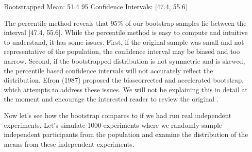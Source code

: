 \documentclass[letterpaper,10pt,english]{sphinxmanual}
\begin{document}
\begin{sphinxVerbatim}[commandchars=\\\{\}]
\PYG{l+s+s1}{95\PYGZpc{} Confidence Intervals: [}\PYG{l+s+s1}{]}
\end{sphinxVerbatim}

\begin{sphinxVerbatim}[commandchars=\\\{\}]
Bootstrapped Mean: 51.4
95\PYGZpc{} Confidence Intervals: [47.4, 55.6]
\end{sphinxVerbatim}

\noindent{}

The percentile method reveals that 95\% of our bootstrap samples lie between the interval {[}47.4, 55.6{]}. While the percentile method is easy to compute and intuitive to understand, it has some issues. First, if the original sample was small and not representative of the population, the confidence interval may be biased and too narrow. Second, if the bootstrapped distribution is not symmetric and is skewed, the percentile based confidence intervals will not accurately reflect the distribution. Efron (1987) proposed the bias\sphinxhyphen{}corrected and accelerated bootstrap, which attempts to address these issues. We will not be explaining this in detail at the moment and encourage the interested reader to review the original .

Now let’s see how the bootstrap compares to if we had run real independent experiments. Let’s simulate 1000 experiments where we randomly sample independent participants from the population and examine the distribution of the means from these independent experiments.
\end{document}
